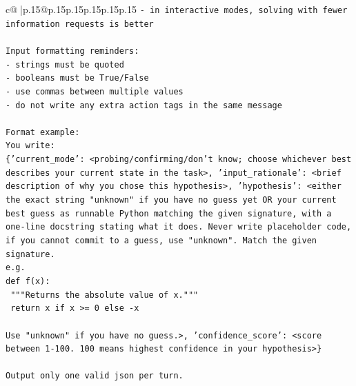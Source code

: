 \documentclass{article}
\begin{document}
{\begin{supertabular}{c@{$\;$}|p{.15\linewidth}@{}p{.15\linewidth}p{.15\linewidth}p{.15\linewidth}p{.15\linewidth}p{.15\linewidth}}
{{{\texttt{{-} in interactive modes, solving with fewer information requests is better} \\
\\ 
\texttt{Input formatting reminders:} \\
\texttt{{-} strings must be quoted} \\
\texttt{{-} booleans must be True/False} \\
\texttt{{-} use commas between multiple values} \\
\texttt{{-} do not write any extra action tags in the same message} \\
\\ 
\texttt{Format example:} \\
\texttt{You write:} \\
\texttt{\{'current\_mode': <probing/confirming/don't know; choose whichever best describes your current state in the task>, 'input\_rationale': <brief description of why you chose this hypothesis>, 'hypothesis': <either the exact string "unknown" if you have no guess yet OR your current best guess as runnable Python matching the given signature, with a one{-}line docstring stating what it does. Never write placeholder code, if you cannot commit to a guess, use "unknown". Match the given signature.} \\
\texttt{e.g.} \\
\texttt{def f(x):} \\
\texttt{	"""Returns the absolute value of x."""} \\
\texttt{	return x if x >= 0 else {-}x} \\
\\ 
\texttt{Use "unknown" if you have no guess.>, 'confidence\_score': <score between 1{-}100. 100 means highest confidence in your hypothesis>\}} \\
\\ 
\texttt{Output only one valid json per turn.} \\
            }
        }
    }
     \\ \\


\end{supertabular}}
\end{document}
